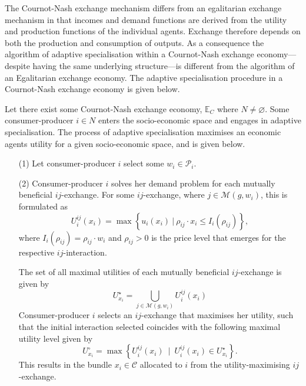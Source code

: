 The Cournot-Nash exchange mechanism differs from an egalitarian exchange mechanism in that incomes and demand functions are derived from the utility and production functions of the individual agents. Exchange therefore depends on both the production and consumption of outputs. As a consequence the algorithm of adaptive specialisation within a Cournot-Nash exchange economy---despite having the same underlying structure---is different from the algorithm of an Egalitarian exchange economy. The adaptive specialisation procedure in a Cournot-Nash exchange economy is given below.

\begin{algorithm}
Let there exist some Cournot-Nash exchange economy, $\mathbb{E}_{C}$ where $N \neq \varnothing$. Some consumer-producer $i \in N$ enters the socio-economic space and engages in adaptive specialisation. The process of adaptive specialisation maximises an economic agents utility for a given socio-economic space, and is given below.

\begin{itemize}
	\item[(1)] Let consumer-producer $i$ select some $w_{i} \in \mathcal{P}_{i}$.

	\item[(2)] Consumer-producer $i$ solves her demand problem for each mutually beneficial $ij$-exchange. For some $ij$-exchange, where $j \in \mathcal{M}(g,w_{i})$, this is formulated as
	    \begin{equation}
	    U^{ij}_{i}(x_{i}) = \max \left\{ u_{i}(x_{i}) ~ | ~ \rho_{ij} \cdot x_{i} \leqslant I_{i}(\rho_{ij}) \right\} ,
	    \end{equation}
	    where $I_{i}(\rho_{ij}) = \rho_{ij} \cdot w_{i}$ and $\rho_{ij} > 0$ is the price level that emerges for the respective $ij$-interaction.

	    The set of all maximal utilities of each mutually beneficial $ij$-exchange is given by
	    \begin{equation}
	    U^{\star}_{x_i} = \bigcup_{j \in \mathcal{M}(g,w_{i})} U^{ij}_{i}(x_{i})
	    \end{equation}
	    Consumer-producer $i$ selects an $ij$-exchange that maximises her utility, such that the initial interaction selected coincides with the following maximal utility level given by
	    \begin{equation}
	    U^{\circ}_{x_i} = \max \left\{ U^{ij}_{i}(x_{i}) ~ \mid ~ U^{ij}_{i}(x_{i}) \in U^{\star}_{x_i} \right\} .
	    \end{equation}
	    This results in the bundle $x_{i} \in \mathcal{C}$ allocated to $i$ from the utility-maximising $ij$-exchange.


\end{itemize}
\end{algorithm}
